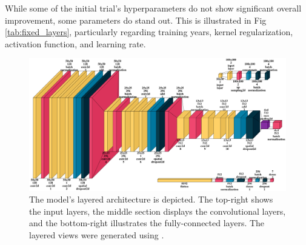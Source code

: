 While some of the initial trial's hyperparameters do not show significant overall improvement, some parameters do stand out. This is illustrated in Fig\,\ref{tab:fixed_layers}, particularly regarding training years, kernel regularization, activation function, and learning rate.


\begin{figure}[ht]
    \centering
    \includegraphics[width=0.9\linewidth]{figures/figures_tuner/model_layered_view.png}
    \caption{The model's layered architecture is depicted. The top-right shows the input layers, the middle section displays the convolutional layers, and the bottom-right illustrates the fully-connected layers. The layered views were generated using \cite{visualkeras}.}
    \label{fig:model_layered_view}
\end{figure}